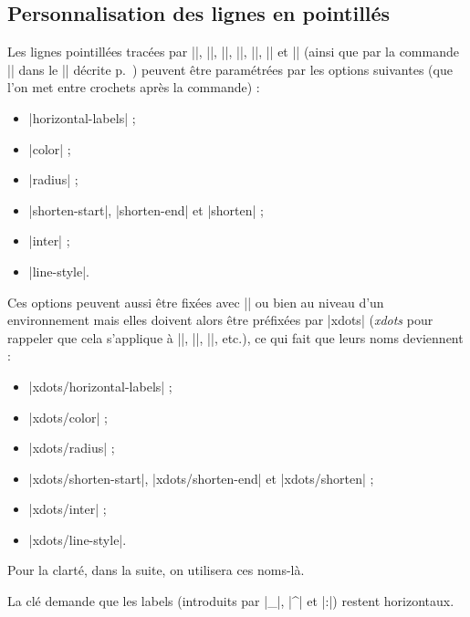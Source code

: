 \documentclass[dvipsnames]{article}%
\begin{document}
\subsection{Personnalisation des lignes en pointillés}

\label{customization}


Les lignes pointillées tracées par |\Ldots|, |\Cdots|, |\Vdots|, |\Ddots|,
|\Iddots|, |\Hdotsfor| et |\Vdotsfor| (ainsi que par la commande |\line| dans le
|\CodeAfter| décrite p.~\pageref{line-in-code-after}) peuvent être paramétrées
par les options suivantes (que l'on met entre crochets après la commande) :
%
\begin{itemize}
\item |horizontal-labels| ;
\item |color| ;
\item |radius| ; 
\item |shorten-start|, |shorten-end| et |shorten| ;
\item |inter| ;
\item |line-style|.
\end{itemize}

Ces options peuvent aussi être fixées avec |\NiceMatrixOptions| ou bien au
niveau d'un environnement mais elles doivent alors être préfixées par |xdots|
(\textsl{xdots} pour rappeler que cela s'applique à |\Cdots|, |\Ldots|,
|\Vdots|, etc.), ce qui fait que leurs noms deviennent :
%
\begin{itemize}
\item |xdots/horizontal-labels| ;
\item |xdots/color| ;
\item |xdots/radius| ;
\item |xdots/shorten-start|, |xdots/shorten-end| et |xdots/shorten| ;
\item |xdots/inter| ; 
\item |xdots/line-style|.
\end{itemize}
%
Pour la clarté, dans la suite, on utilisera ces noms-là.

\bigskip
La clé  demande que les labels (introduits
par |_|, |^| et |:|) restent horizontaux.
\end{document}
